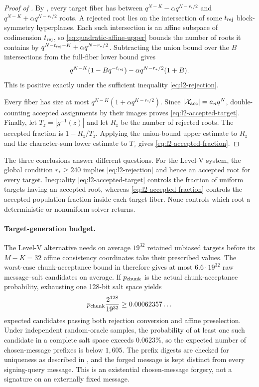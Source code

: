 \documentclass[11pt]{article}
\begin{document}
\begin{proof}[Proof of ]
By , every target fiber has between
$q^{N-K}-\alpha q^{N-r_*/2}$ and
$q^{N-K}+\alpha q^{N-r_*/2}$ roots.  A rejected root lies on
the intersection of some $t_{\rm rej}$ block-symmetry hyperplanes.  Each such
intersection is an affine subspace of codimension $t_{\rm rej}$, so
\eqref{eq:quadratic-affine-upper} bounds the number of roots it contains by
$q^{N-t_{\rm rej}-K}+\alpha q^{N-r_*/2}$.  Subtracting the union bound
over the $B$ intersections from the full-fiber lower bound gives
\[
 q^{N-K}(1-Bq^{-t_{\rm rej}})
 -\alpha q^{N-r_*/2}(1+B).
\]
This is positive exactly under the sufficient inequality
\eqref{eq:l2-rejection}.

Every fiber has size at most
$q^{N-K}(1+\alpha q^{K-r_*/2})$.  Since
$|\mathcal X_{\rm acc}|=a_n q^N$, double-counting accepted assignments by their images
proves \eqref{eq:l2-accepted-target}.  Finally, let
$T_z=|g^{-1}(z)|$ and let $R_z$ be the number of rejected roots.  The accepted
fraction is $1-R_z/T_z$.  Applying the union-bound upper estimate to $R_z$ and
the character-sum lower estimate to $T_z$ gives
\eqref{eq:l2-accepted-fraction}.
\end{proof}

The three conclusions answer different questions.  For the Level-V system,
the global condition $r_*\ge240$ implies \eqref{eq:l2-rejection} and hence an
accepted root for every target.  Inequality \eqref{eq:l2-accepted-target}
controls the fraction of uniform targets having an accepted root, whereas
\eqref{eq:l2-accepted-fraction} controls the accepted population fraction
inside each target fiber.  None controls which root a deterministic or
nonuniform solver returns.

\paragraph{Target-generation budget.}
The Level-V alternative needs on average $19^{32}$ retained unbiased targets
before its $M-K=32$ affine consistency coordinates take their prescribed
values.  The worst-case chunk-acceptance bound in
 therefore gives at most
$6.6\cdot19^{32}$ raw message--salt candidates on average.  If
$p_{\rm chunk}$ is the actual chunk-acceptance probability, exhausting one
128-bit salt space yields
\[
 p_{\rm chunk}\frac{2^{128}}{19^{32}}
 \ge 0.00062357\ldots
\]
expected candidates passing both rejection conversion and affine
preselection.  Under independent random-oracle samples, the probability of at
least one such candidate in a complete salt space exceeds $0.0623\%$, so the
expected number of chosen-message prefixes is below $1{,}605$.  The prefix
digests are checked for uniqueness as described in
, and the forged message is kept distinct from every
signing-query message.  This is an existential chosen-message forgery, not a
signature on an externally fixed message.
\end{document}

